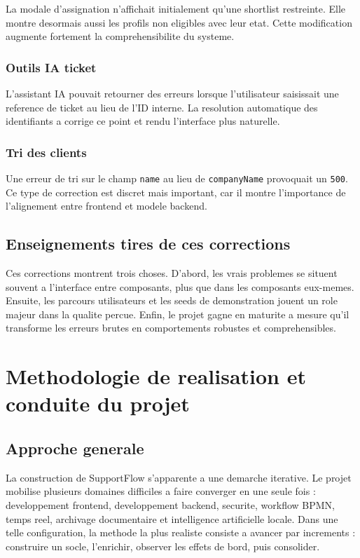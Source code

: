 \documentclass[12pt,a4paper,oneside]{report}
\begin{document}
La modale d'assignation n'affichait initialement qu'une shortlist restreinte. Elle montre desormais aussi les profils non eligibles avec leur etat. Cette modification augmente fortement la comprehensibilite du systeme.

\subsection{Outils IA ticket}

L'assistant IA pouvait retourner des erreurs lorsque l'utilisateur saisissait une reference de ticket au lieu de l'ID interne. La resolution automatique des identifiants a corrige ce point et rendu l'interface plus naturelle.

\subsection{Tri des clients}

Une erreur de tri sur le champ \texttt{name} au lieu de \texttt{companyName} provoquait un \texttt{500}. Ce type de correction est discret mais important, car il montre l'importance de l'alignement entre frontend et modele backend.

\section{Enseignements tires de ces corrections}

Ces corrections montrent trois choses. D'abord, les vrais problemes se situent souvent a l'interface entre composants, plus que dans les composants eux-memes. Ensuite, les parcours utilisateurs et les seeds de demonstration jouent un role majeur dans la qualite percue. Enfin, le projet gagne en maturite a mesure qu'il transforme les erreurs brutes en comportements robustes et comprehensibles.

\chapter{Methodologie de realisation et conduite du projet}

\section{Approche generale}

La construction de SupportFlow s'apparente a une demarche iterative. Le projet mobilise plusieurs domaines difficiles a faire converger en une seule fois : developpement frontend, developpement backend, securite, workflow BPMN, temps reel, archivage documentaire et intelligence artificielle locale. Dans une telle configuration, la methode la plus realiste consiste a avancer par increments : construire un socle, l'enrichir, observer les effets de bord, puis consolider.
\end{document}
